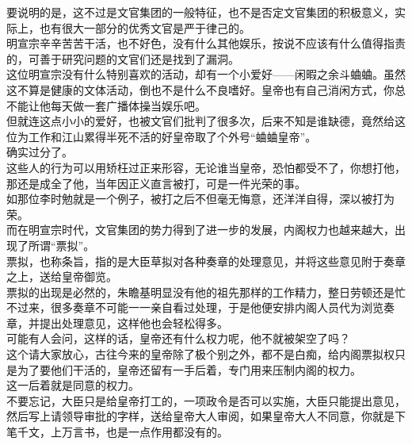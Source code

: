 \begin{multicols}{\theparacolNo}
要说明的是，这不过是文官集团的一般特征，也不是否定文官集团的积极意义，实际上，也有很大一部分的优秀文官是严于律己的。\\

明宣宗辛辛苦苦干活，也不好色，没有什么其他娱乐，按说不应该有什么值得指责的，可善于研究问题的文官们还是找到了漏洞。\\

这位明宣宗没有什么特别喜欢的活动，却有一个小爱好——闲暇之余斗蛐蛐。虽然这不算是健康的文体活动，倒也不是什么不良嗜好。皇帝也有自己消闲方式，你总不能让他每天做一套广播体操当娱乐吧。\\

但就连这点小小的爱好，也被文官们批判了很多次，后来不知是谁缺德，竟然给这位为工作和江山累得半死不活的好皇帝取了个外号“蛐蛐皇帝”。\\

确实过分了。\\

这些人的行为可以用矫枉过正来形容，无论谁当皇帝，恐怕都受不了，你想打他，那还是成全了他，当年因正义直言被打，可是一件光荣的事。\\

如那位李时勉就是一个例子，被打之后不但毫无悔意，还洋洋自得，深以被打为荣。\\

而在明宣宗时代，文官集团的势力得到了进一步的发展，内阁权力也越来越大，出现了所谓“票拟”。\\

票拟，也称条旨，指的是大臣草拟对各种奏章的处理意见，并将这些意见附于奏章之上，送给皇帝御览。\\

票拟的出现是必然的，朱瞻基明显没有他的祖先那样的工作精力，整日劳顿还是忙不过来，很多奏章不可能一一亲自看过处理，于是他便安排内阁人员代为浏览奏章，并提出处理意见，这样他也会轻松得多。\\

可能有人会问，这样的话，皇帝还有什么权力呢，他不就被架空了吗？\\

这个请大家放心，古往今来的皇帝除了极个别之外，都不是白痴，给内阁票拟权只是为了要他们干活的，皇帝还留有一手后着，专门用来压制内阁的权力。\\

这一后着就是同意的权力。\\

不要忘记，大臣只是给皇帝打工的，一项政令是否可以实施，大臣只能提出意见，然后写上请领导审批的字样，送给皇帝大人审阅，如果皇帝大人不同意，你就是下笔千文，上万言书，也是一点作用都没有的。\\


\end{multicols}
